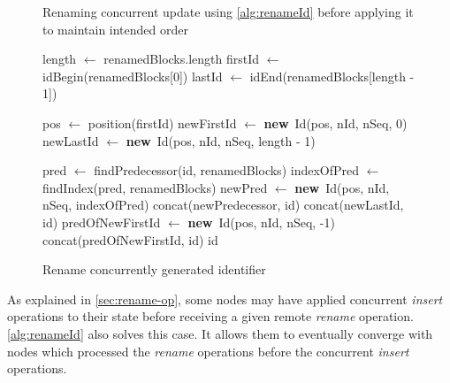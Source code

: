 \documentclass[10pt,journal,compsoc]{IEEEtran}
\let\MYoriglatexcaption\caption
\renewcommand{\caption}[2][\relax]{\MYoriglatexcaption[#2]{#2}}
\newcommand{\new}{\textbf{new}}
\newcommand{\trm}[1]{\mathit{#1}}
\begin{document}
\begin{figure}[t!]
\begin{tikzpicture}
    \end{tikzpicture}
    \caption{Renaming concurrent update using \autoref{alg:renameId} before applying it to maintain intended order}
    \label{fig:concurrent-insert-rename-fixed}
\end{figure}

\begin{figure}
    \begin{algorithmic}


            \State length $\gets$ renamedBlocks.length
            \State firstId $\gets$ idBegin(renamedBlocks[0])
            \State lastId $\gets$ idEnd(renamedBlocks[length - 1])

            \State pos $\gets$ position(firstId)
            \State newFirstId $\gets$ \new~Id(pos, nId, nSeq, 0)
            \State newLastId $\gets$ \new~Id(pos, nId, nSeq, length - 1)

                \State pred $\gets$ findPredecessor(id, renamedBlocks)
                \State indexOfPred $\gets$ findIndex(pred, renamedBlocks)
                \State newPred $\gets$ \new~Id(pos, nId, nSeq, indexOfPred)
                \State \Return concat(newPredecessor, id)
                \State \Return concat(newLastId, id)
                \State predOfNewFirstId $\gets$ \new~Id(pos, nId, nSeq, -1)
                \State \Return concat(predOfNewFirstId, id)
            \Else
                \State \Return id 
            \EndIf
        \EndFunction
    \end{algorithmic}
    \caption{Rename concurrently generated identifier}
    \label{alg:renameId}
\end{figure}

As explained in \autoref{sec:rename-op}, some nodes may have applied concurrent \emph{insert} operations to their state before receiving a given remote \emph{rename} operation.
\autoref{alg:renameId} also solves this case.
It allows them to eventually converge with nodes which processed the \emph{rename} operations before the concurrent \emph{insert} operations.
\end{document}
